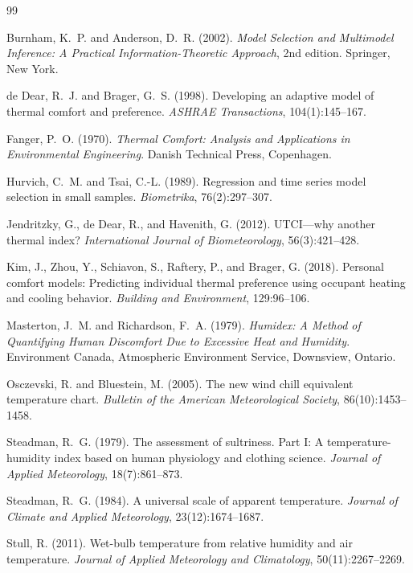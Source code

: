 \documentclass[11pt]{article}
\begin{document}
\begin{thebibliography}{99}

Burnham, K.~P. and Anderson, D.~R. (2002).
\newblock \emph{Model Selection and Multimodel Inference: A Practical
  Information-Theoretic Approach}, 2nd edition.
\newblock Springer, New York.

de Dear, R.~J. and Brager, G.~S. (1998).
\newblock Developing an adaptive model of thermal comfort and preference.
\newblock \emph{ASHRAE Transactions}, 104(1):145--167.

Fanger, P.~O. (1970).
\newblock \emph{Thermal Comfort: Analysis and Applications in Environmental
  Engineering}.
\newblock Danish Technical Press, Copenhagen.

Hurvich, C.~M. and Tsai, C.-L. (1989).
\newblock Regression and time series model selection in small samples.
\newblock \emph{Biometrika}, 76(2):297--307.

Jendritzky, G., de Dear, R., and Havenith, G. (2012).
\newblock UTCI---why another thermal index?
\newblock \emph{International Journal of Biometeorology}, 56(3):421--428.

Kim, J., Zhou, Y., Schiavon, S., Raftery, P., and Brager, G. (2018).
\newblock Personal comfort models: Predicting individual thermal preference
  using occupant heating and cooling behavior.
\newblock \emph{Building and Environment}, 129:96--106.

Masterton, J.~M. and Richardson, F.~A. (1979).
\newblock \emph{Humidex: A Method of Quantifying Human Discomfort Due to
  Excessive Heat and Humidity}.
\newblock Environment Canada, Atmospheric Environment Service, Downsview,
  Ontario.

Osczevski, R. and Bluestein, M. (2005).
\newblock The new wind chill equivalent temperature chart.
\newblock \emph{Bulletin of the American Meteorological Society},
  86(10):1453--1458.

Steadman, R.~G. (1979).
\newblock The assessment of sultriness. Part I: A temperature-humidity index
  based on human physiology and clothing science.
\newblock \emph{Journal of Applied Meteorology}, 18(7):861--873.

Steadman, R.~G. (1984).
\newblock A universal scale of apparent temperature.
\newblock \emph{Journal of Climate and Applied Meteorology}, 23(12):1674--1687.

Stull, R. (2011).
\newblock Wet-bulb temperature from relative humidity and air temperature.
\newblock \emph{Journal of Applied Meteorology and Climatology},
  50(11):2267--2269.

\end{thebibliography}
\end{document}
